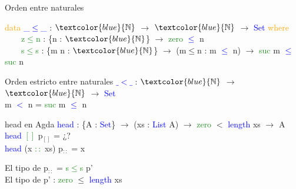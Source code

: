 \documentclass[xcolor=dvipsnames]{beamer} %
\newcommand{\cf}[1]{\textcolor{blue}{#1}}
\newcommand{\ct}[1]{\textcolor{blue}{#1}}
\newcommand{\cc}[1]{\textcolor{ForestGreen}{#1}}
\newcommand{\ck}[1]{\textcolor{orange}{#1}}
\newcommand{\N}{\ct{\mathbb{N}}}
\newcommand{\ra}{\rightarrow}
\begin{document}
\begin{frame}

\begin{block}{Orden entre naturales}

\ck{data} \ct{\_$\leq$\_} : $\N$ $\ra$ $\N$ $\ra$ \ct{Set} \ck{where}\\
\ \ \ \ \cc{z$\leq$n} : \{n : $\N$\}                 $\ra$ \cc{zero}  \ct{$\leq$} n\\
\ \ \ \ \cc{s$\leq$s} : \{m n : $\N$\} $\ra$ (m$\leq$n : m \ct{$\leq$} n) $\ra$ \cc{suc} m \ct{$\leq$} \cc{suc} n

\end{block}

\begin{block}{Orden estricto entre naturales}
\cf{$\_<\_$} : $\N$ $\ra$ $\N$ $\ra$ \ct{Set}\\
m \cf{$<$} n = \cc{suc} m \cf{$\leq$} n
\end{block}

\begin{block}{head en Agda}
    \cf{head} : \{A : \ct{Set}\}  $\ra$ (xs : \ct{List} A) $\ra$ 
    \cc{zero} $<$ \ct{length} xs $\rightarrow$ A \\
    \cf{head} \cc{$[]$} p$_{[]}$ = ¿?\\
    \cf{head} (x \cc{$::$} xs) p$_{::}$ = x
  \end{block}  

\begin{block}{}
El tipo de p$_{::}$ = \cc{s$\leq$s} p'\\
El tipo de p' : \cc{zero} $\leq$ \cf{length} xs
\end{block}

\end{frame}
\end{document}
